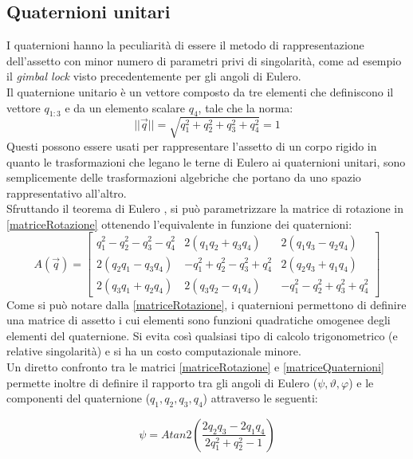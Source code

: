 \subsection{Quaternioni unitari}
\label{quaternioni}
I quaternioni hanno la peculiarità di essere il metodo di rappresentazione dell'assetto con minor numero di parametri privi di singolarità, come ad esempio il \textit{gimbal lock} visto precedentemente per gli angoli di Eulero.\\
Il quaternione unitario è un vettore composto da tre elementi che definiscono il vettore \textbf{$q_{1:3}$} e da un elemento scalare $q_4$, tale che la norma:
\begin{equation}
 ||\overrightarrow{q}|| = \sqrt{q_1^2 + q_2^2 + q_3^2 + q_4^2}=1
\end{equation}
Questi possono essere usati per rappresentare l'assetto di un corpo rigido in quanto le trasformazioni che legano le terne di Eulero ai quaternioni unitari, sono semplicemente delle trasformazioni algebriche che portano da uno spazio rappresentativo all'altro.\\
Sfruttando il teorema di Eulero \cite{assetto2}, si può parametrizzare la matrice di rotazione in \ref{matriceRotazione} ottenendo l'equivalente in funzione dei quaternioni:
\begin{equation}
\label{matriceQuaternioni}
A(\overrightarrow{q})= \begin{bmatrix}
 q_1^2 -  q_2^2 -  q_3^2 -  q_4^2 & 2(q_1 q_2 + q_3  q_4) & 2(q_1 q_3 - q_2 q_4) \\
2(q_2 q_1 - q_3 q_4)    &  -q_1^2 + q_2^2 -  q_3^2 +  q_4^2  & 2(q_2 q_3 + q_1q_4)\\
2(q_3 q_1 + q_2 q_4)    & 2(q_3 q_2 - q_1 q_4)  &  -q_1^2 -  q_2^2 +  q_3^2 +  q_4^2
\end{bmatrix}
\end{equation}
Come si può notare dalla \ref{matriceRotazione}, i quaternioni permettono di definire una matrice di assetto i cui elementi sono funzioni quadratiche omogenee degli elementi del quaternione. Si evita così qualsiasi tipo di calcolo trigonometrico (e relative singolarità) e si ha un costo computazionale minore.\\

Un diretto confronto tra le matrici \ref{matriceRotazione} e \ref{matriceQuaternioni} permette inoltre di definire il rapporto tra gli angoli di Eulero ($\psi,\vartheta,\varphi$) e le componenti del quaternione ($q_1, q_2, q_3,q_4$) attraverso le seguenti:

\begin{equation}
\psi = Atan2 \left( \frac{2q_2q_3 - 2q_1q_4}{2q_1^2+q_2^2 -1}\right)
\end{equation}

